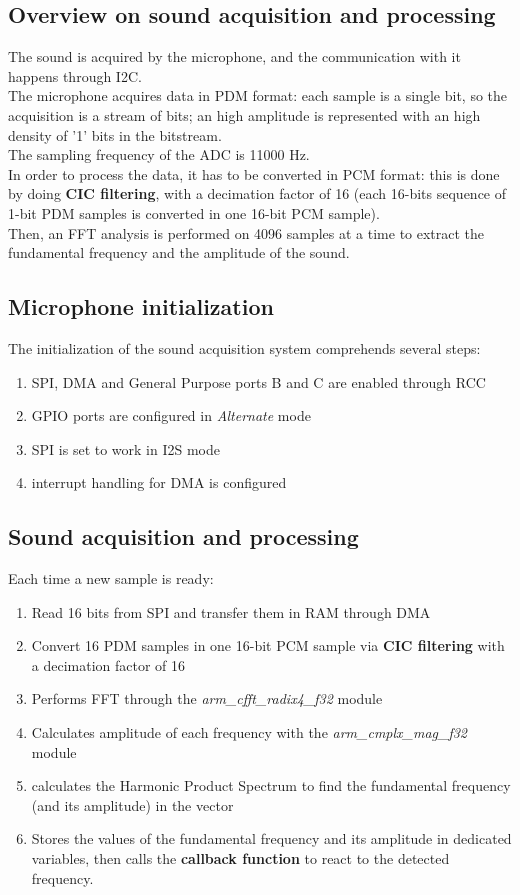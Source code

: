\subsection{Overview on sound acquisition and processing}
The sound is acquired by the microphone, and the communication with it happens through I2C.\\
The microphone acquires data in PDM format: each sample is a single bit, so the acquisition is a stream of bits; an high amplitude is represented with an high density of '1' bits in the bitstream. \\
The sampling frequency of the ADC is 11000 Hz. \\
In order to process the data, it has to be converted in PCM format: this is done by doing \textbf{CIC filtering}, with a decimation factor of 16 (each 16-bits sequence of 1-bit PDM samples is converted in one 16-bit PCM sample).\\
Then, an FFT analysis is performed on 4096 samples at a time to extract the fundamental frequency and the amplitude of the sound.

\subsection{Microphone initialization}
The initialization of the sound acquisition system comprehends several steps:
\begin{enumerate}
	\item SPI, DMA and General Purpose ports B and C are enabled through RCC
	\item GPIO ports are configured in \textit{Alternate} mode
	\item SPI is set to work in I2S mode
	\item interrupt handling for DMA is configured
	
\end{enumerate}

\subsection{Sound acquisition and processing}
Each time a new sample is ready:
\begin{enumerate}
	\item Read 16 bits from SPI and transfer them in RAM through DMA
	\item  Convert 16 PDM samples in one 16-bit PCM sample via \textbf{CIC filtering} with a decimation factor of 16
	\item Performs FFT through the \textit{arm\_cfft\_radix4\_f32}  module
	\item Calculates amplitude of each frequency with the \textit{arm\_cmplx\_mag\_f32} module
	\item calculates the Harmonic Product Spectrum to find the fundamental frequency (and its amplitude) in the vector
	\item Stores the values of the fundamental frequency and its amplitude in dedicated variables, then calls the \textbf{callback function} to react to the detected frequency.
\end{enumerate}
